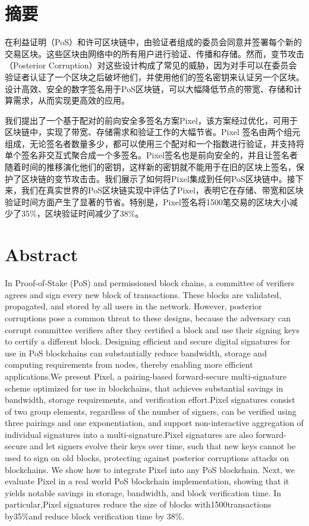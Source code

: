 \section*{摘要}
在利益证明（PoS）和许可区块链中，由验证者组成的委员会同意并签署每个新的交易区块。这些区块由网络中的所有用户进行验证、传播和存储。然而，变节攻击（Posterior Corruption）对这些设计构成了常见的威胁，因为对手可以在委员会验证者认证了一个区块之后破坏他们，并使用他们的签名密钥来认证另一个区块。设计高效、安全的数字签名用于PoS区块链，可以大幅降低节点的带宽、存储和计算需求，从而实现更高效的应用。

我们提出了一个基于配对的前向安全多签名方案Pixel，该方案经过优化，可用于区块链中，实现了带宽、存储需求和验证工作的大幅节省。Pixel 签名由两个组元组成，无论签名者数量多少，都可以使用三个配对和一个指数进行验证，并支持将单个签名非交互式聚合成一个多签名。Pixel签名也是前向安全的，并且让签名者随着时间的推移演化他们的密钥，这样新的密钥就不能用于在旧的区块上签名，保护了区块链的变节攻击击。我们展示了如何将Pixel集成到任何PoS区块链中。接下来，我们在真实世界的PoS区块链实现中评估了Pixel，表明它在存储、带宽和区块验证时间方面产生了显著的节省。特别是，Pixel签名将1500笔交易的区块大小减少了35\%，区块验证时间减少了38\%。

\clearpage  %

\section*{Abstract}
In Proof-of-Stake (PoS) and permissioned block chains, a committee of verifiers agrees and sign every new block of transactions. These blocks are validated, propagated, and stored by all users in the network. However, posterior corruptions pose a common threat to these designs, because the adversary can corrupt committee verifiers after they certified a block and use their signing keys to certify a different block. Designing efficient and secure digital signatures for use in PoS blockchains can substantially reduce bandwidth, storage and computing requirements from nodes, thereby enabling more efficient applications.We present Pixel, a pairing-based forward-secure multi-signature  scheme  optimized  for  use  in  blockchains, that achieves substantial savings in bandwidth, storage requirements, and verification effort.Pixel signatures consist of two group elements, regardless of the number of signers, can be verified using three pairings and one exponentiation, and support non-interactive aggregation of individual signatures into a multi-signature.Pixel signatures are also forward-secure and let signers evolve their keys over time, such that new keys cannot be used to sign on old blocks, protecting against posterior corruptions attacks on blockchains. We show how to integrate Pixel into any PoS blockchain. Next, we evaluate Pixel in a real world PoS blockchain implementation, showing that it yields notable savings in storage, bandwidth, and block verification time. In particular,Pixel signatures reduce the size of blocks with1500transactions by35\%and reduce block verification time by 38\%.

